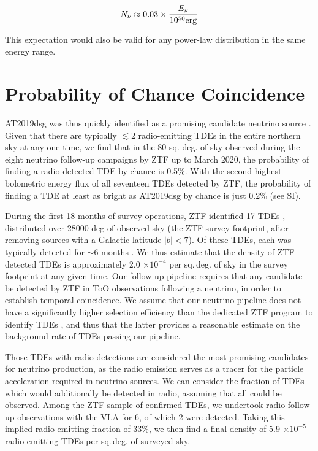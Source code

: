 \begin{equation}
N_\nu \approx  0.03 \times \frac{E_{\nu}}{10^{50} \textup{erg}}
\end{equation} 

This expectation would also be valid for any power-law distribution in the same energy range.


\section{Probability of Chance Coincidence}

AT2019dsg was thus quickly identified as a promising candidate neutrino source \cite{2019ATel13160....1S}. Given that there are typically $\lesssim$2 radio-emitting TDEs in the entire northern sky at any one time, we find that in the 80 sq. deg. of sky observed during the eight neutrino follow-up campaigns by ZTF up to March 2020, the probability of finding a radio-detected TDE by chance is 0.5\%. With the second highest bolometric energy flux of all seventeen TDEs detected by ZTF, the probability of finding a TDE at least as bright as AT2019dsg by chance is just 0.2\% (see SI).

During the first 18 months of survey operations, ZTF identified 17 TDEs \cite{2020arXiv200101409V}, distributed over 28000 deg of observed sky (the ZTF survey footprint, after removing sources with a Galactic latitude $|b|<7$). Of these TDEs, each was typically detected for $\sim$6 months \cite{2020arXiv200101409V}. We thus estimate that the density of ZTF-detected TDEs is approximately 2.0 $\times 10^{-4}$ per sq.\,deg. of sky in the survey footprint at any given time. Our follow-up pipeline requires that any candidate be detected by ZTF in ToO observations following a neutrino, in order to establish temporal coincidence. We assume that our neutrino pipeline does not have a significantly higher selection efficiency than the dedicated ZTF program to identify TDEs \cite{2020arXiv200101409V}, and thus that the latter provides a reasonable estimate on the background rate of TDEs passing our pipeline.

Those TDEs with radio detections are considered the most promising candidates for neutrino production, as the radio emission serves as a tracer for the particle acceleration required in neutrino sources. We can consider the fraction of TDEs which would additionally be detected in radio, assuming that all could be observed. Among the ZTF sample of confirmed TDEs, we undertook radio follow-up observations with the VLA for 6, of which 2 were detected. Taking this implied radio-emitting fraction of 33\%, we then find a final density of 5.9 $\times 10^{-5}$ radio-emitting TDEs per sq.\,deg. of surveyed sky. 

